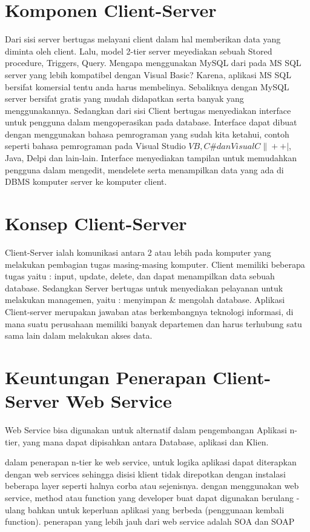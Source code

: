 \section{Komponen Client-Server}
Dari sisi server bertugas melayani client dalam hal memberikan data yang diminta oleh client.
Lalu, model 2-tier server meyediakan sebuah Stored procedure, Triggers, Query. 
Mengapa menggunakan MySQL dari pada MS SQL server yang lebih kompatibel dengan Visual Basic? Karena, aplikasi MS SQL bersifat komersial tentu 
anda harus membelinya. Sebaliknya dengan MySQL server bersifat gratis yang mudah didapatkan serta banyak yang menggunakannya. 
Sedangkan dari sisi Client bertugas menyediakan interface untuk pengguna dalam mengoperasikan pada database. Interface dapat dibuat dengan 
menggunakan bahasa pemrograman yang sudah kita ketahui, contoh seperti bahasa pemrograman pada Visual Studio 
\(VB, C\# dan Visual C\|++|\), Java, Delpi dan lain-lain. 
Interface menyediakan tampilan untuk memudahkan pengguna dalam mengedit, mendelete serta menampilkan data yang ada di DBMS komputer server 
ke komputer client.

\section{Konsep Client-Server}
Client-Server ialah komunikasi antara 2 atau lebih pada komputer yang melakukan pembagian tugas masing-masing komputer. 
Client memiliki beberapa tugas yaitu : input, update, delete, dan dapat menampilkan data sebuah database. 
Sedangkan Server bertugas untuk menyediakan pelayanan untuk melakukan managemen, yaitu : 
menyimpan \& mengolah database. 
Aplikasi Client-server merupakan jawaban atas berkembangnya teknologi informasi, 
di mana suatu perusahaan memiliki banyak departemen dan harus terhubung satu sama lain dalam melakukan akses data.

\section{Keuntungan Penerapan Client-Server Web Service}
Web Service bisa digunakan untuk alternatif dalam pengembangan Aplikasi n-tier, yang mana dapat dipisahkan
antara Database, aplikasi dan Klien. 

dalam penerapan n-tier ke web service, untuk logika aplikasi dapat diterapkan dengan web services
sehingga disisi klient tidak direpotkan dengan instalasi beberapa layer seperti halnya corba atau sejenisnya.
dengan menggunakan web service, method atau function yang developer buat dapat digunakan berulang - ulang bahkan
untuk keperluan aplikasi yang berbeda (penggunaan kembali function). penerapan yang lebih jauh dari web service adalah SOA dan SOAP

